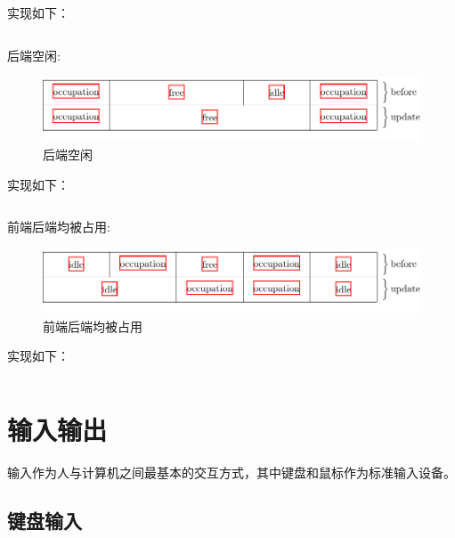 \documentclass{swfcthesis}
\begin{document}
		实现如下：

		\begin{listing}[H]
		\inputminted[tabsize=2, firstline=98, lastline=116,
		linenos=true]{c}{../ZOS/src/kernel/memory.c}
		\end{listing}

		后端空闲:

		\begin{figure}[h]
			\centering
			\includegraphics[width=.8\textwidth]{fig/mem2.pdf}
			\caption{后端空闲}
			\label{fig:mem1}
		\end{figure}

		实现如下：

		\begin{listing}[H]
		\inputminted[tabsize=2, firstline=118, lastline=127,
		linenos=true]{c}{../ZOS/src/kernel/memory.c}
		\end{listing}

		前端后端均被占用:

		\begin{figure}[h]
			\centering
			\includegraphics[width=.8\textwidth]{fig/mem3.pdf}
			\caption{前端后端均被占用}
			\label{fig:mem1}
		\end{figure}

		实现如下：

		\begin{listing}[H]
		\inputminted[tabsize=2, firstline=128, lastline=141,
		linenos=true]{c}{../ZOS/src/kernel/memory.c}
		\end{listing}

    \section{输入输出}
	
		输入作为人与计算机之间最基本的交互方式，其中键盘和鼠标作为标准输入设备。

		\subsection{键盘输入}
		
\end{document}
